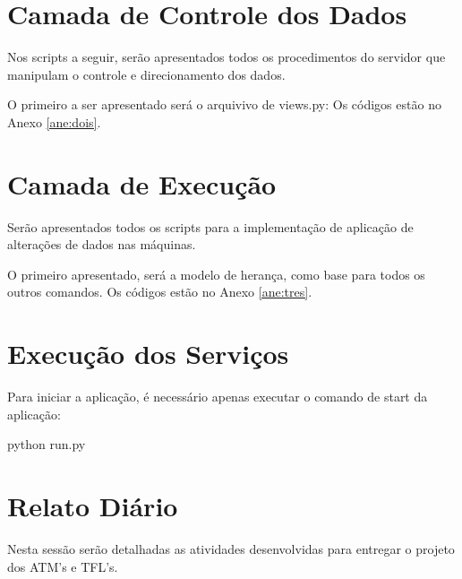         

    \section{Camada de Controle dos Dados}
{\color{black}
    Nos scripts a seguir, ser\~ao apresentados todos os procedimentos do servidor que manipulam o controle e direcionamento
        dos dados.}

{\color{black}
    O primeiro a ser apresentado ser\'a o arquivivo de views.py:}
Os códigos estão no Anexo \ref{ane:dois}.

    \section{Camada de Execu\c{c}\~ao}
{\color{black}
    Ser\~ao apresentados todos os scripts para a implementa\c{c}\~ao de aplica\c{c}\~ao de altera\c{c}\~oes de dados nas
        m\'aquinas.}

{\color{black}
    O primeiro apresentado, ser\'a a modelo de heran\c{c}a, como base para todos os outros comandos.}
Os códigos estão no Anexo \ref{ane:tres}.

    \section{Execu\c{c}\~ao dos Servi\c{c}os}
{\color{black}
    Para iniciar a aplica\c{c}\~ao, \'e necess\'ario apenas executar o comando de start da aplica\c{c}\~ao:}

{\ttfamily\color[rgb]{0.10980392,0.10980392,0.10980392}
    python run.py}

\section{Relato Diário}
\label{sec:relato_di_rio}

Nesta sessão serão detalhadas as atividades desenvolvidas para entregar o
projeto dos ATM's e TFL's.

